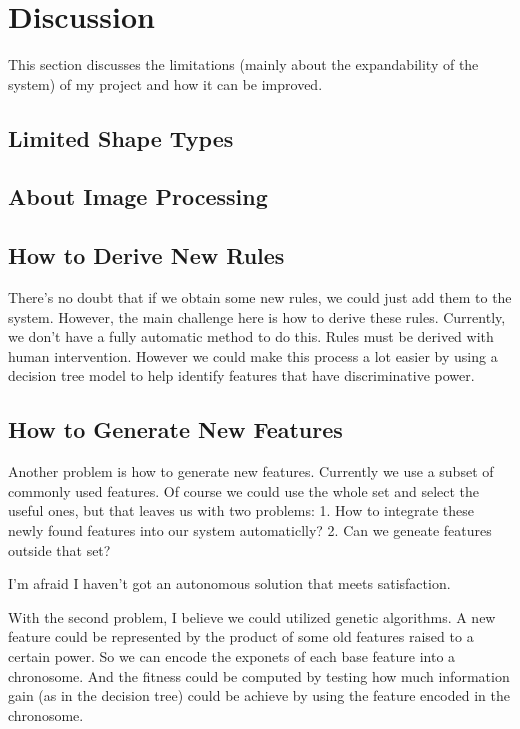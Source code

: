\section{Discussion}

This section discusses the limitations (mainly about the expandability of the system) of my project and how it can be improved.

\subsection{Limited Shape Types}

\subsection{About Image Processing}

\subsection{How to Derive New Rules}

There's no doubt that if we obtain some new rules, we could just add them to the system. However, the main challenge here is how to derive these rules. Currently, we don't have a fully automatic method to do this. Rules must be derived with human intervention. However we could make this process a lot easier by using a decision tree model to help identify features that have discriminative power. 

\subsection{How to Generate New Features}

Another problem is how to generate new features. Currently we use a subset of commonly used features. Of course we could use the whole set and select the useful ones, but that leaves us with two problems: 1. How to integrate these newly found features into our system automaticlly? 2. Can 
we geneate features outside that set?

I'm afraid I haven't got an autonomous solution that meets satisfaction.

With the second problem, I believe we could utilized genetic algorithms. A new feature could be represented by the product of some old features raised to a certain power. So we can encode the exponets of each base feature into a chronosome. And the fitness could be computed by testing how much information gain (as in the decision tree) could be achieve by using the feature encoded in the chronosome.

